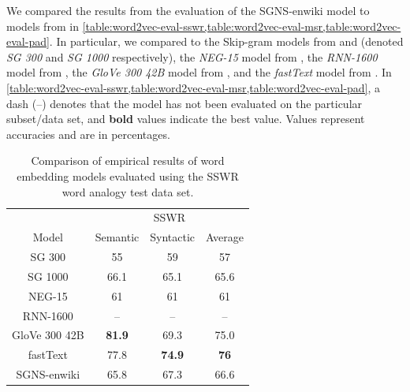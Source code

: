 We compared the results from the evaluation of the SGNS-enwiki model to models from \cite{mikolov2013a, mikolov2013b, mikolov-etal-2013-linguistic, bojanowski2017enriching} in \cref{table:word2vec-eval-sswr,table:word2vec-eval-msr,table:word2vec-eval-pad}. In particular, we compared to the Skip-gram models from \cite[Table 3]{mikolov2013a} and \cite[Table 6]{mikolov2013a} (denoted \textit{SG 300} and \textit{SG 1000} respectively), the \textit{NEG-15} model from \cite[Table 1 and 3]{mikolov2013b}, the \textit{RNN-1600} model from \cite[Table 2]{mikolov-etal-2013-linguistic}, the \textit{GloVe 300 42B} model from \cite[Table 2]{pennington2014glove}, and the \textit{fastText} model from \cite[Table 2]{bojanowski2017enriching}. In \cref{table:word2vec-eval-sswr,table:word2vec-eval-msr,table:word2vec-eval-pad}, a dash (--) denotes that the model has not been evaluated on the particular subset/data set, and \textbf{bold} values indicate the best value. Values represent accuracies and are in percentages.
\begin{table}[H]
    \centering
    \begin{tabular}{@{}cccc@{}}
    \toprule
    & \multicolumn{3}{c}{SSWR} \\ \cmidrule(l){2-4}
    \multirow{-2}{*}{Model} & Semantic & Syntactic & Average \\ \midrule
    \trcolor
    SG 300 & 55 & 59 & 57 \\
    SG 1000 & 66.1 & 65.1 & 65.6 \\
    \trcolor
    NEG-15 & 61 & 61 & 61 \\
    RNN-1600 & -- & -- & -- \\
    \trcolor
    GloVe 300 42B & \textbf{81.9} & 69.3 & 75.0 \\
    fastText & 77.8 & \textbf{74.9} & \textbf{76} \\
    \trcolor
    SGNS-enwiki & 65.8 & 67.3 & 66.6 \\
    \bottomrule
    \end{tabular}
    \caption{Comparison of empirical results of word embedding models evaluated using the SSWR word analogy test data set.}
    \label{table:word2vec-eval-sswr}
\end{table}
